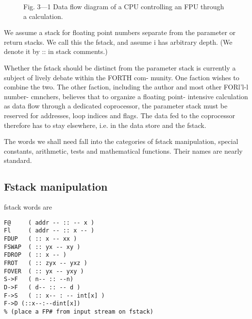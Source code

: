 \begin{figure}
\caption{Fig. 3—1 Data flow diagram of a CPU controlling an FPU through a calculation.}
\end{figure}

We assume a stack for floating point numbers separate from the 
parameter or return stacks. We call this the fstack, and assume i
has arbitrary depth. (We denote it by :: in stack comments.)

\leftbar[1\linewidth] 
Whether the fstack should be distinct from the parameter stack
is currently a subject of lively debate within the FORTH com-
munity. One faction wishes to combine the two. The other
faction, including the author and most other FORl'l-l number-
cmnchers, believes that to organize a floating point- intensive
calculation as data ﬂow through a dedicated coprocessor, the
parameter stack must be reserved for addresses, loop indices and
ﬂags. The data fed to the coprocessor therefore has to stay
elsewhere, i.e. in the data store and the fstack.
\endleftbar

The words we shall need fall into the categories of fstack 
manipulation, special constants, arithmetic, tests and mathematical functions.
Their names are nearly standard.

\subsection{Fstack manipulation}
 fstack words are
\begin{verbatim}
F@     ( addr -- :: -- x )
Fl     ( addr -- :: x -- )
FDUP   ( :: x -- xx )
FSWAP  ( :: yx -- xy )
FDROP  ( :: x -- )
FROT   ( :: zyx -- yxz )
FOVER  ( :: yx -- yxy )
S->F   ( n-- :: --n)
D->F   ( d-- :: -- d )
F->S   ( :: x-- : -- int[x] )
F->D (::x--:--dint[x])
% (place a FP# from input stream on fstack)
\end{verbatim}
 
